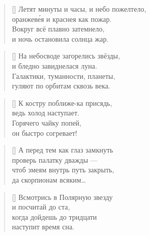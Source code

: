 \documentclass[a5paper,11pt]{memoir}
\begin{document}
\begin{verse}[\versewidth]
Летят минуты и часы, и небо пожелтело, \\
оранжев\'{е}я и краснея как пожар. \\
Вокруг всё плавно затемнело, \\
и ночь остановила солнца жар.
\end{verse}

\begin{verse}[\versewidth]
На небосводе загорелись звёзды, \\
и бледно завиднелася луна. \\
Галактики, туманности, планеты, \\
гуляют по орбитам сквозь века.
\end{verse}


\begin{verse}[\versewidth]
К костру поближе-ка присядь, \\
ведь холод наступает. \\
Горячего чайку попей, \\
он быстро согревает!
\end{verse}


\hfill
\vspace{6cm}
\begin{verse}[\versewidth]
\hspace{-3cm}А перед тем как глаз замкнуть \\
\hspace{-3cm}проверь палатку дважды --- \\
\hspace{-3cm}чтоб змеям внутрь путь закрыть, \\
\hspace{-3cm}да скорпионам всяким\ldots
\end{verse}


\vspace{1cm}
\begin{verse}[\versewidth]
\hspace{4cm}Всмотрись в Полярную звезду \\
\hspace{4cm}и посчитай до ста, \\
\hspace{4cm}когда дойдешь до тридцати \\
\hspace{4cm}наступит время сна.
\end{verse}
\end{document}
